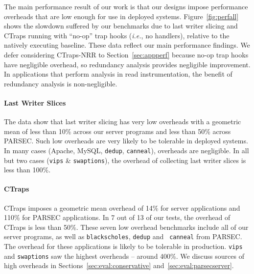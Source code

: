 \documentclass[preprint,9pt]{sigplanconf}
\newcommand{\ctraps}{CTraps\xspace}
\newcommand{\ctrapsmm}{CTraps-NRR\xspace}
\begin{document}
The main performance result of our work is that our designs impose performance
overheads that are low enough for use in deployed systems.
Figure~\ref{fig:perfall} shows the slowdown suffered by our benchmarks due to last writer slicing
and \ctraps running with ``no-op'' trap hooks ({\em i.e.}, no
handlers), relative to the natively executing baseline.  These data reflect
our main performance findings.  We defer considering \ctrapsmm to
Section~\ref{sec:appperf} because no-op trap hooks have negligible overhead, so
redundancy analysis provides negligible improvement.  In applications that
perform analysis in read instrumentation, the benefit of redundancy analysis is
non-negligible.  

\paragraph{Last Writer Slices}
The data show that last writer slicing has very low overheads with a geometric mean of less
than 10\% across our server programs and less than 50\% across PARSEC.  Such
low overheads are very likely to be tolerable in deployed systems.  In many
cases (Apache, MySQL, {\tt dedup}, {\tt canneal}), overheads are negligible.
In all but two cases ({\tt vips} \& {\tt swaptions}), the overhead of collecting last writer slices is
less than 100\%.    

\paragraph{\ctraps}
\ctraps imposes a geometric mean overhead of 14\% for server applications
and 110\% for PARSEC applications.  In 7 out of 13 of our tests, the overhead
of \ctraps is less than 50\%.  These seven low overhead benchmarks include
all of our server programs, as well as {\tt blackscholes}, {\tt dedup} and {\tt
canneal} from PARSEC.  The overhead for these applications is likely to be
tolerable in production.  {\tt vips} and {\tt swaptions} saw the highest
overheads -- around 400\%.  We discuss sources of high overheads in
Sections~\ref{sec:eval:conservative} and~\ref{sec:eval:parsecserver}.
\end{document}
